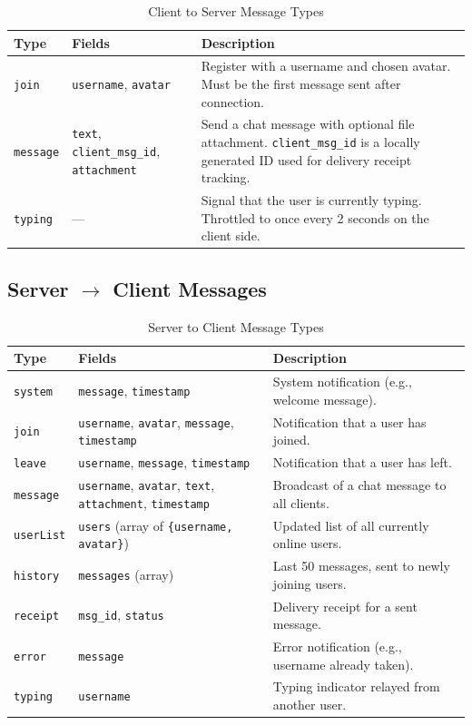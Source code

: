 \documentclass[12pt, a4paper]{article}
\begin{document}
\begin{table}[H]
    \centering
    \caption{Client to Server Message Types}
    \begin{tabularx}{\textwidth}{l l X}
        \toprule
        \textbf{Type} & \textbf{Fields} & \textbf{Description} \\
        \midrule
        \texttt{join}    & \texttt{username}, \texttt{avatar} & Register with a username and chosen avatar. Must be the first message sent after connection. \\
        \texttt{message} & \texttt{text}, \texttt{client\_msg\_id}, \texttt{attachment} & Send a chat message with optional file attachment. \texttt{client\_msg\_id} is a locally generated ID used for delivery receipt tracking. \\
        \texttt{typing}  & — & Signal that the user is currently typing. Throttled to once every 2 seconds on the client side. \\
        \bottomrule
    \end{tabularx}
\end{table}

\subsection{Server $\rightarrow$ Client Messages}

\begin{table}[H]
    \centering
    \caption{Server to Client Message Types}
    \begin{tabularx}{\textwidth}{l l X}
        \toprule
        \textbf{Type} & \textbf{Fields} & \textbf{Description} \\
        \midrule
        \texttt{system}   & \texttt{message}, \texttt{timestamp} & System notification (e.g., welcome message). \\
        \texttt{join}     & \texttt{username}, \texttt{avatar}, \texttt{message}, \texttt{timestamp} & Notification that a user has joined. \\
        \texttt{leave}    & \texttt{username}, \texttt{message}, \texttt{timestamp} & Notification that a user has left. \\
        \texttt{message}  & \texttt{username}, \texttt{avatar}, \texttt{text}, \texttt{attachment}, \texttt{timestamp} & Broadcast of a chat message to all clients. \\
        \texttt{userList} & \texttt{users} (array of \texttt{\{username, avatar\}}) & Updated list of all currently online users. \\
        \texttt{history}  & \texttt{messages} (array) & Last 50 messages, sent to newly joining users. \\
        \texttt{receipt}  & \texttt{msg\_id}, \texttt{status} & Delivery receipt for a sent message. \\
        \texttt{error}    & \texttt{message} & Error notification (e.g., username already taken). \\
        \texttt{typing}   & \texttt{username} & Typing indicator relayed from another user. \\
        \bottomrule
    \end{tabularx}
\end{table}
\end{document}
